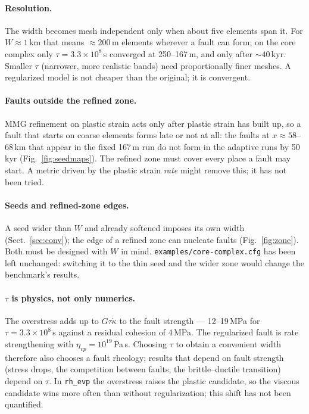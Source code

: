 \documentclass[11pt]{article}
\newcommand{\code}[1]{\texttt{#1}}
\begin{document}
\paragraph{Resolution.} The width becomes mesh independent only when about five elements span it.
For $W\approx1$\,km that means $\approx200$\,m elements wherever a fault can form; on the core complex
only $\tau=3.3\times10^8$\,s converged at 250--167\,m, and only after $\sim40$\,kyr. Smaller $\tau$
(narrower, more realistic bands) need proportionally finer meshes. A regularized model is not
cheaper than the original; it is convergent.

\paragraph{Faults outside the refined zone.} MMG refinement on plastic strain acts only after
plastic strain has built up, so a fault that starts on coarse elements forms late or not at all: the
faults at $x\approx58$--68\,km that appear in the fixed 167\,m run do not form in the adaptive runs by
50\,kyr (Fig.~\ref{fig:seedmaps}). The refined zone must cover every place a fault may start. A metric
driven by the plastic strain \emph{rate} might remove this; it has not been tried.

\paragraph{Seeds and refined-zone edges.} A seed wider than $W$ and already softened imposes its own
width (Sect.~\ref{sec:conv}); the edge of a refined zone can nucleate faults (Fig.~\ref{fig:zone}).
Both must be designed with $W$ in mind. \code{examples/core-complex.cfg} has been left unchanged:
switching it to the thin seed and the wider zone would change the benchmark's results.

\paragraph{$\tau$ is physics, not only numerics.} The overstress adds up to $G\tau\dot\kappa$ to the
fault strength --- 12--19\,MPa for $\tau=3.3\times10^8$\,s against a residual cohesion of 4\,MPa. The
regularized fault is rate strengthening with $\eta_{vp}=10^{19}$\,Pa\,s. Choosing $\tau$ to obtain a
convenient width therefore also chooses a fault rheology; results that depend on fault strength
(stress drops, the competition between faults, the brittle--ductile transition) depend on $\tau$.
In \code{rh\_evp} the overstress raises the plastic candidate, so the viscous candidate wins more
often than without regularization; this shift has not been quantified.
\end{document}
